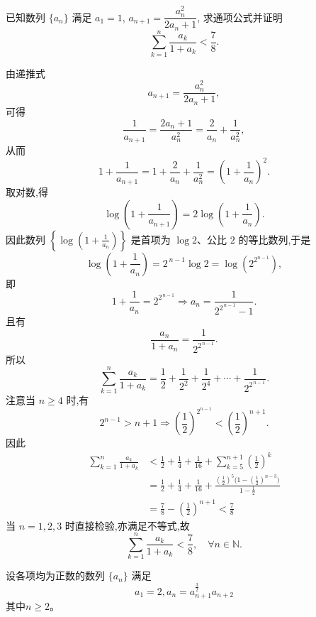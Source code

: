 \begin{questions}
    \question 已知数列 $\{a_n\}$ 满足 $a_1=1$, $a_{n+1}=\dfrac{a_n^2}{2a_n+1}$, 求通项公式并证明
    \[
    \sum_{k=1}^{n}\frac{a_k}{1+a_k}<\frac{7}{8}.
    \]
    \begin{solution}
        由递推式
        \[
        a_{n+1}=\frac{a_n^2}{2a_n+1},
        \]
        可得
        \[
        \frac{1}{a_{n+1}}=\frac{2a_n+1}{a_n^2}=\frac{2}{a_n}+\frac{1}{a_n^2},
        \]
        从而
        \[
        1+\frac{1}{a_{n+1}}=1+\frac{2}{a_n}+\frac{1}{a_n^2}=\left(1+\frac{1}{a_n}\right)^2.
        \]
        取对数,得
        \[
        \log\!\left(1+\frac{1}{a_{n+1}}\right)=2\log\!\left(1+\frac{1}{a_n}\right).
        \]
        因此数列 $\left\{\log\!\left(1+\tfrac{1}{a_n}\right)\right\}$ 是首项为 $\log 2$、公比 $2$ 的等比数列,于是
        \[
        \log\!\left(1+\frac{1}{a_n}\right)=2^{\,n-1}\log 2=\log\!\left(2^{2^{n-1}}\right),
        \]
        即
        \[
        1+\frac{1}{a_n}=2^{2^{\,n-1}}\Rightarrow a_n=\frac{1}{2^{2^{\,n-1}}-1}.
        \]
        且有
        \[
        \frac{a_n}{1+a_n}=\frac{1}{2^{2^{\,n-1}}}.
        \]
        所以
        \[
        \sum_{k=1}^{n}\frac{a_k}{1+a_k}=\frac{1}{2}+\frac{1}{2^2}+\frac{1}{2^4}+\cdots+\frac{1}{2^{2^{\,n-1}}}.
        \]
        注意当 $n\geq 4$ 时,有
        \[
        2^{n-1} > n+1 \Rightarrow \left(\frac{1}{2}\right)^{2^{n-1}} < \left(\frac{1}{2}\right)^{n+1}.
        \]
        因此
        \begin{align*}
        \sum_{k=1}^{n}\frac{a_k}{1+a_k}
        &< \frac{1}{2}+\frac{1}{4}+\frac{1}{16}+\sum_{k=5}^{n+1}\left(\frac{1}{2}\right)^k \\
        &= \frac{1}{2}+\frac{1}{4}+\frac{1}{16}+\frac{\left(\tfrac{1}{2}\right)^5\bigl(1-(\tfrac{1}{2})^{n-3}\bigr)}{1-\tfrac{1}{2}} \\
        &= \frac{7}{8}-\left(\frac{1}{2}\right)^{n+1} < \frac{7}{8}
        \end{align*}
        当 $n=1,2,3$ 时直接检验,亦满足不等式,故
        \[
        \sum_{k=1}^{n}\frac{a_k}{1+a_k}<\frac{7}{8},\quad \forall n\in\mathbb{N}.
        \]
    \end{solution}

    \question 设各项均为正数的数列 $\{a_{n}\}$ 满足 
    \[
    a_{1}=2, a_{n} = a_{n+1}^{\frac{3}{2}}a_{n+2}
    \]
    其中$n\ge2$。
\end{questions}
